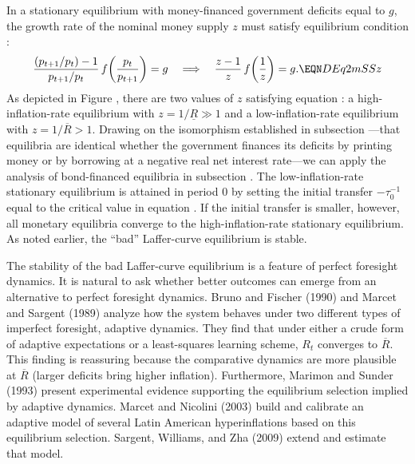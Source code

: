 In a stationary equilibrium with money-financed government deficits
equal to $g$, the growth rate of the nominal money supply $z$ must
satisfy equilibrium condition :
$$
  {(p_{t+1}/p_t) - 1 \over p_{t+1}/p_t}\,
        f\!\left({p_t \over p_{t+1}}\right) = g
  \quad \Longrightarrow \quad
  {z - 1 \over z}\,f\!\left({1 \over z}\right) = g.
  \EQN DEq2mSSz
$$
As depicted in Figure , there are two values of $z$
satisfying equation : a high-inflation-rate equilibrium
with $z = 1/\underline{R} \gg 1$ and a low-inflation-rate equilibrium
with $z = 1/\overline{R} > 1$.
Drawing on the isomorphism established in subsection
---that equilibria are identical whether the
government finances its deficits by printing money or by borrowing at
a negative real net interest rate---we can apply the analysis of
bond-financed equilibria in subsection .
The low-inflation-rate stationary equilibrium is attained in period $0$
by setting the initial transfer $-\tau^{-1}_0$ equal to the critical
value in equation .
If the initial transfer is smaller, however, all monetary equilibria
converge to the high-inflation-rate stationary equilibrium.
As noted earlier, the ``bad'' Laffer-curve equilibrium is stable.

The stability of the bad Laffer-curve equilibrium is a
feature of perfect foresight dynamics. It is natural to ask whether better
outcomes can emerge from an alternative to perfect foresight dynamics. 
Bruno and Fischer (1990) and Marcet and Sargent (1989) analyze how the
system behaves under two different types of imperfect foresight, adaptive dynamics.
They find that under either a crude form of adaptive expectations or a
least-squares learning scheme, $R_t$ converges to $\overline{R}$.
This finding is reassuring because the comparative dynamics are more
plausible at $\overline{R}$ (larger deficits bring higher inflation).
Furthermore, Marimon and Sunder (1993) present experimental evidence
supporting the equilibrium selection implied by adaptive dynamics.
Marcet and Nicolini (2003) build and calibrate an adaptive model of
several Latin American hyperinflations based on this equilibrium
selection.
Sargent, Williams, and Zha (2009) extend and estimate that model.

%
%
%
%
%
%
%
%
%








